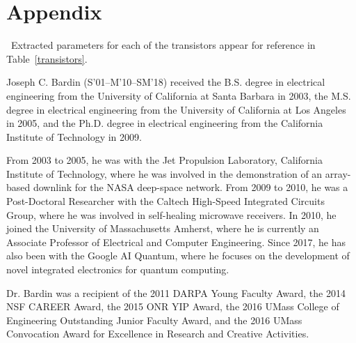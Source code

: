 \documentclass[journal]{IEEEtran}
\begin{document}
\section*{Appendix}\
Extracted parameters for each of the transistors appear for reference in Table~\ref{transistors}.






\begin{IEEEbiography}{Joseph C. Bardin}
(S’01–M’10–SM’18) received the B.S. degree in electrical engineering from the University of California at Santa Barbara in 2003, the M.S. degree in electrical engineering from the University of California at Los Angeles in 2005, and the Ph.D. degree in electrical engineering from the California Institute of Technology in 2009. 

From 2003 to 2005, he was with the Jet Propulsion Laboratory, California Institute of Technology, where he was involved in the demonstration of an array-based downlink for the NASA deep-space network. From 2009 to 2010, he was a Post-Doctoral Researcher with the Caltech High-Speed Integrated Circuits Group, where he was involved in self-healing microwave receivers. In 2010, he joined the University of Massachusetts Amherst, where he is currently an Associate Professor of Electrical and Computer Engineering. Since 2017, he has also been with the Google AI Quantum, where he focuses on the development of novel integrated electronics for quantum computing. 

Dr. Bardin was a recipient of the 2011 DARPA Young Faculty Award, the 2014 NSF CAREER Award, the 2015 ONR YIP Award, the 2016 UMass College of Engineering Outstanding Junior Faculty Award, and the 2016 UMass Convocation Award for Excellence in Research and Creative Activities.
\end{IEEEbiography}
\end{document}
